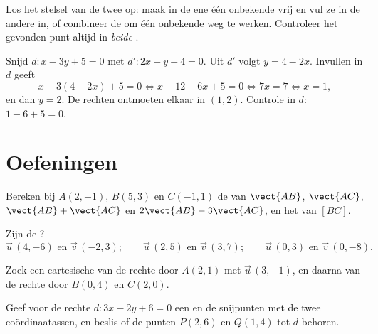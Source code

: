 \begin{method}\label{met:g11:vect:intersection}
Los het stelsel van de twee  op: maak in de ene 
één onbekende vrij en vul ze in de andere in, of combineer de 
om één onbekende weg te werken. Controleer het gevonden punt altijd in
\emph{beide} .
\end{method}

\begin{example}\label{ex:g11:vect:intersection}
Snijd $d: x - 3y + 5 = 0$ met $d': 2x + y - 4 = 0$. Uit $d'$ volgt
$y = 4 - 2x$. Invullen in $d$ geeft
\[
x - 3(4 - 2x) + 5 = 0
\iff x - 12 + 6x + 5 = 0
\iff 7x = 7
\iff x = 1,
\]
en dan $y = 2$. De rechten ontmoeten elkaar in $(1, 2)$. Controle in $d$:
$1 - 6 + 5 = 0$.
\end{example}

\section{Oefeningen}

\begin{exercise}[$\star$]\label{exo:g11:vect:1}
Bereken bij $A(2, -1)$, $B(5, 3)$ en $C(-1, 1)$ de  van
$\vect{AB}$, $\vect{AC}$, $\vect{AB} + \vect{AC}$ en
$2\vect{AB} - 3\vect{AC}$, en het  van $[BC]$.
\end{exercise}

\begin{exercise}[$\star$]\label{exo:g11:vect:2}
Zijn de  ?
\[
\vec u\,(4, -6) \text{ en } \vec v\,(-2, 3); \qquad
\vec u\,(2, 5) \text{ en } \vec v\,(3, 7); \qquad
\vec u\,(0, 3) \text{ en } \vec v\,(0, -8).
\]
\end{exercise}

\begin{exercise}[$\star$]\label{exo:g11:vect:3}
Zoek een cartesische  van de rechte door $A(2, 1)$ met
 $\vec u\,(3, -1)$, en daarna van de rechte door $B(0, 4)$ en
$C(2, 0)$.
\end{exercise}

\begin{exercise}[$\star$]\label{exo:g11:vect:4}
Geef voor de rechte $d: 3x - 2y + 6 = 0$ een  en de
snijpunten met de twee coördinaatassen, en beslis of de punten $P(2, 6)$ en
$Q(1, 4)$ tot $d$ behoren.
\end{exercise}

